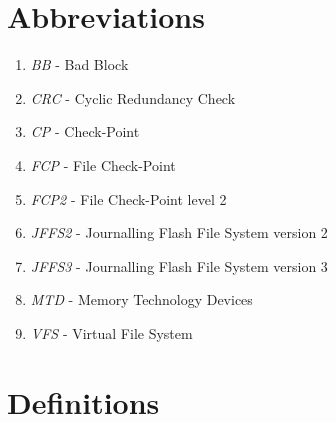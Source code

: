 \documentclass[12pt,a4paper,oneside,titlepage]{article}
\begin{document}
\section{Abbreviations}
\begin{enumerate}
\item \emph{BB} - Bad Block
\item \emph{CRC} - Cyclic Redundancy Check
\item \emph{CP} -  Check-Point
\item \emph{FCP} -  File Check-Point
\item \emph{FCP2} - File Check-Point level 2
\item \emph{JFFS2} - Journalling Flash File System version 2
\item \emph{JFFS3} - Journalling Flash File System version 3
\item \emph{MTD} - Memory Technology Devices
\item \emph{VFS} - Virtual File System
\end{enumerate}


%
%
\section{Definitions}
\end{document}

